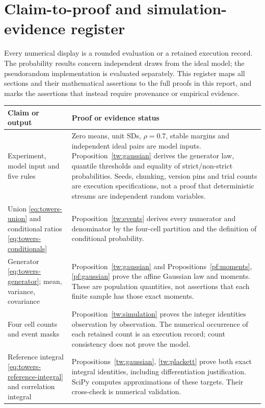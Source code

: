 \chapter{Claim-to-proof and simulation-evidence register}
\label{sec:towers-simulation-claim-map}
Every numerical display is a rounded evaluation or a retained execution
record. The probability results concern independent draws from the ideal
model; the pseudorandom implementation is evaluated separately. This register
maps all sections and their mathematical assertions to the full proofs in
this report, and marks the assertions that instead require provenance or
empirical evidence.

\small
\begin{longtable}{>{\raggedright\arraybackslash}p{.29\linewidth}>{\raggedright\arraybackslash}p{.64\linewidth}}
\toprule
Claim or output & Proof or evidence status\\
\midrule\endhead
Experiment, model input and five rules
& Zero means, unit SDs, \(\rho=0.7\), stable margins and independent ideal
pairs are model inputs. Proposition~\ref{tw:gaussian} derives the generator
law, quantile thresholds and equality of strict/non-strict probabilities.
Seeds, chunking, version pins and trial counts are execution specifications,
not a proof that deterministic streams are independent random variables.\\
Union \eqref{eq:towers-union} and conditional ratios
\eqref{eq:towers-conditionals}
& Proposition~\ref{tw:events} derives every numerator and denominator by
the four-cell partition and the definition of conditional probability.\\
Generator \eqref{eq:towers-generator}; mean, variance, covariance
& Proposition~\ref{tw:gaussian} and Propositions~\ref{pf:moments},
\ref{pf:gaussian} prove the affine Gaussian law and moments. These are
population quantities, not assertions that each finite sample has those
exact moments.\\
Four cell counts and event masks
& Proposition~\ref{tw:simulation} proves the integer identities observation
by observation. The numerical occurrence of each retained count is an
execution record; count consistency does not prove the model.\\
Reference integral \eqref{eq:towers-reference-integral} and correlation integral
& Propositions~\ref{tw:gaussian}, \ref{tw:plackett} prove both exact
integral identities, including differentiation justification. SciPy computes
approximations of these targets. Their cross-check is numerical validation.\\

\end{longtable}
